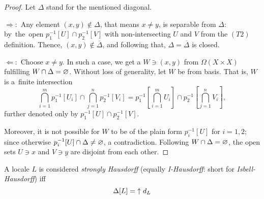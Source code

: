 \begin{proof}
  Let $\Delta$ stand for the mentioned diagonal.

  $\Rightarrow:$ Any element $(x, y)\not\in \Delta$, that means $x \ne y$, is
  separable from $\Delta$:
  by~the~open $p_1^{-1}[U] \cap p_2^{-1}[V]$ with non-intersecting $U$ and $V$
  from the $(T2)$ definition.
  Thence, $(x, y)\not\in \overline{\Delta}$, and following that,
  $\Delta = \overline{\Delta}$ is closed.

  $\Leftarrow:$ Choose $x \ne y$.
  In such a case, we get a $W\owns (x, y)$ from $\Omega(X\times X)$ fulfilling
  $W \cap \Delta = \varnothing$.
  Without loss of generality, let $W$ be from basis.
  That is, $W$ is a~finite intersection
  \[
    \bigcap_{i=1}^m p_1^{-1}[U_i] \cap \bigcap_{j=1}^n p_2^{-1}[V_i] =
    p_1^{-1}[\bigcap_{i=1}^m U_i] \cap p_2^{-1}[\bigcap_{j=1}^n V_i],
  \]
  further denoted only by $p_1^{-1}[U] \cap p_2^{-1}[V]$.

  Moreover, it is not possible for $W$ to be of the plain form $p_i^{-1}[U]$
  for $i = 1, 2$;
  since otherwise $p_i^{-1}[U] \cap \Delta \ne \varnothing$, a contradiction.
  Following $W \cap \Delta = \varnothing$, the open sets $U\owns x$ and $V\owns y$
  are disjoint from each other.
\end{proof}

\begin{framed}
  \begin{df}[I-Haus]
    A locale $L$ is considered \emph{strongly Hausdorff\/} (equally
    \emph{I-Hausdorff}: short for \emph{Isbell-Hausdorff}) iff
    \[
      \Delta[L] = \left\uparrow\right. d_L
    \]
  \end{df}
\end{framed}
